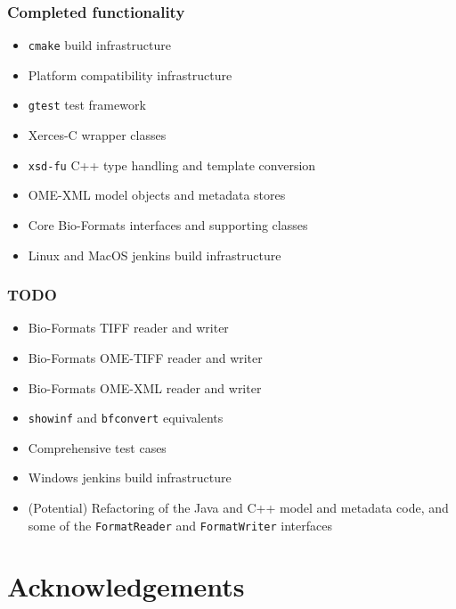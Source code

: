 \documentclass{beamer}
\begin{document}
\begin{frame}[fragile]
  \frametitle{Completed functionality}
  \begin{itemize}
  \item \texttt{cmake} build infrastructure
  \item Platform compatibility infrastructure
  \item \texttt{gtest} test framework
  \item Xerces-C wrapper classes
  \item \texttt{xsd-fu} C++ type handling and template conversion
  \item OME-XML model objects and metadata stores
  \item Core Bio-Formats interfaces and supporting classes
  \item Linux and MacOS jenkins build infrastructure
  \end{itemize}
\end{frame}

\begin{frame}[fragile]
  \frametitle{TODO}
  \begin{itemize}
  \item Bio-Formats TIFF reader and writer
  \item Bio-Formats OME-TIFF reader and writer
  \item Bio-Formats OME-XML reader and writer
  \item \texttt{showinf} and \texttt{bfconvert} equivalents
  \item Comprehensive test cases
  \item Windows jenkins build infrastructure
  \item (Potential) Refactoring of the Java and C++ model and metadata code, and
    some of the \texttt{FormatReader} and \texttt{FormatWriter}
    interfaces
  \end{itemize}
\end{frame}

\section*{Acknowledgements}
\end{document}
